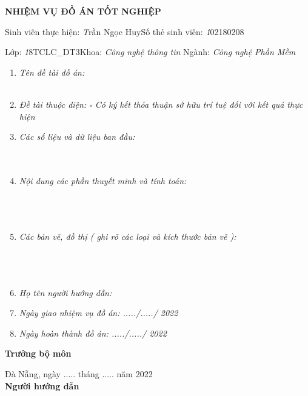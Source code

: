 \documentclass[11pt]{report}
\newcommand{\at}{Đà Nẵng, ngày ..... tháng ..... năm 2022}
\newcommand{\me}{Trần Ngọc Huy}
\newcommand{\msv}{102180208}
\newcommand{\myclass}{18TCLC\_DT3}
\begin{document}
	\center\Large\textbf{NHIỆM VỤ ĐỒ ÁN TỐT NGHIỆP}
	\vspace{14px}
	\fontsize{12px}{12px}\selectfont
	
	Sinh viên thực hiện: \emph\me \dotfill Số thẻ sinh viên: \emph\msv \dotfill 
	
	Lớp: \emph\myclass \dotfill Khoa: \emph{Công nghệ thông tin} \dotfill Ngành: \emph{Công nghệ Phần Mềm} \dotfill
	
	\begin{enumerate}
		\item\emph{Tên đề tài đồ án: \\\dotfill\\\dotfill}
		\item\emph{Đề tài thuộc diện: $\square$ Có ký kết thỏa thuận sở hữu trí tuệ đối với kết quả thực hiện}
		\item\emph{Các số liệu và dữ liệu ban đầu:\\\dotfill\\\dotfill\\\dotfill}
		\item\emph{Nội dung các phần thuyết minh và tính toán:}
		\\\dotfill\\\dotfill\\\dotfill\\\dotfill
		\item\emph{Các bản vẽ, đồ thị ( ghi rõ các loại và kích thước bản vẽ ):}
		\\\dotfill\\\dotfill\\\dotfill\\\dotfill
		\item\emph{Họ tên người hướng dẫn: \dotfill}
		\item\emph{Ngày giao nhiệm vụ đồ án: ...../...../ 2022 \dotfill}
		\item\emph{Ngày hoàn thành đồ án: ...../...../ 2022 \dotfill}
		
	\end{enumerate}
	\raggedright
	\begin{minipage}[t]{.5\textwidth}
		
		\textbf{Trưởng bộ môn} \dotfill
	\end{minipage}\hfill 
	\begin{minipage}[t]{.5\textwidth}
		\center
		\at\\
		\textbf{Người hướng dẫn}
	\end{minipage}\\[2em]
	\pagebreak
	
\end{document}
